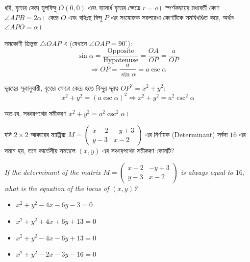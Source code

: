 \documentclass[12pt, a4paper]{article}
\begin{document}
\begin{tcolorbox}[solutionbox={সমাধান (Solution)}]
    \noindent
    ধরি, বৃত্তের কেন্দ্র মূলবিন্দু $O(0, 0)$ এবং ব্যাসার্ধ বৃত্তের ক্ষেত্রে $r = a$। স্পর্শকদ্বয়ের মধ্যবর্তী কোণ $\angle APB = 2\alpha$। কেন্দ্র $O$ এবং বহিঃস্থ বিন্দু $P$ এর সংযোজক সরলরেখা কোণটিকে সমদ্বিখণ্ডিত করে, অর্থাৎ $\angle APO = \alpha$। 
    
    \vspace{0.5em}
    সমকোণী ত্রিভুজ $\triangle OAP$ এ (যেখানে $\angle OAP = 90^{\circ}$):
    \[ \sin\alpha = \frac{\text{Opposite}}{\text{Hypotenuse}} = \frac{OA}{OP} = \frac{a}{OP} \]
    \[ \Rightarrow OP = \frac{a}{\sin\alpha} = a \csc\alpha \]
    
    \vspace{0.5em}
    দূরত্বের সূত্রানুযায়ী, বৃত্তের ক্ষেত্রে কেন্দ্র হতে বিন্দুর দূরত্ব $OP^2 = x^2 + y^2$:
    \[ x^2 + y^2 = (a \csc\alpha)^2 \Rightarrow x^2 + y^2 = a^2 \csc^2\alpha \]
    
    \vspace{0.5em}
    অতএব, সঞ্চারপথের সমীকরণ $x^2 + y^2 = a^2 \csc^2\alpha$।
\end{tcolorbox}

\begin{tcolorbox}[questionbox={প্রশ্ন (Question) 42}]
    \noindent
    যদি $2 \times 2$ আকারের ম্যাট্রিক্স $M = \begin{pmatrix} x-2 & -y+3 \\ y-3 & x-2 \end{pmatrix}$ এর নির্ণায়ক (Determinant) সর্বদা $16$ এর সমান হয়, তবে কার্তেসীয় সমতলে $(x, y)$ এর সঞ্চারপথের সমীকরণ কোনটি?
    
    \vspace{0.8em}
    \begin{english}
    \noindent\textit{\color{darkgray}
    If the determinant of the matrix $M = \begin{pmatrix} x-2 & -y+3 \\ y-3 & x-2 \end{pmatrix}$ is always equal to $16$, what is the equation of the locus of $(x, y)$?
    }
    \end{english}
\end{tcolorbox}

\begin{itemize}[label={}, leftmargin=1cm, itemsep=0.5em]
    \item[\textbf{A)}] $x^2 + y^2 - 4x - 6y - 3 = 0$
    \item[\textbf{B)}] $x^2 + y^2 + 4x + 6y + 13 = 0$
    \item[\textbf{C)}] $x^2 + y^2 - 4x - 6y + 13 = 0$
    \item[\textbf{D)}] $x^2 + y^2 - 2x - 3y - 16 = 0$
\end{itemize}
\end{document}
